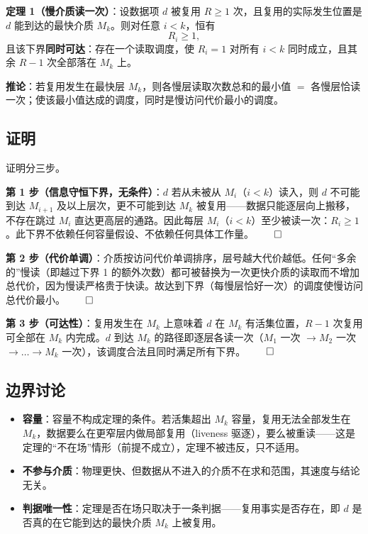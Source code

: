 \documentclass[11pt]{ctexart}
\begin{document}
\textbf{定理 1（慢介质读一次）}：设数据项 $d$ 被复用 $R\ge 1$ 次，且复用的实际发生位置是 $d$ 能到达的最快介质 $M_k$。则对任意 $i<k$，恒有
\[
R_i\ge 1,
\]
且该下界\textbf{同时可达}：存在一个读取调度，使 $R_i=1$ 对所有 $i<k$ 同时成立，且其余 $R-1$ 次全部落在 $M_k$ 上。

\textbf{推论}：若复用发生在最快层 $M_k$，则各慢层读取次数总和的最小值 $=$ 各慢层恰读一次；使该最小值达成的调度，同时是慢访问代价最小的调度。

\subsection{证明}

证明分三步。

\textbf{第 1 步（信息守恒下界，无条件）}：$d$ 若从未被从 $M_i$（$i<k$）读入，则 $d$ 不可能到达 $M_{i+1}$ 及以上层次，更不可能到达 $M_k$ 被复用——数据只能逐层向上搬移，不存在跳过 $M_i$ 直达更高层的通路。因此每层 $M_i$（$i<k$）至少被读一次：$R_i\ge 1$。此下界不依赖任何容量假设、不依赖任何具体工作量。\ensuremath{\qed}

\textbf{第 2 步（代价单调）}：介质按访问代价单调排序，层号越大代价越低。任何“多余的”慢读（即越过下界 1 的额外次数）都可被替换为一次更快介质的读取而不增加总代价，因为慢读严格贵于快读。故达到下界（每慢层恰好一次）的调度使慢访问总代价最小。\ensuremath{\qed}

\textbf{第 3 步（可达性）}：复用发生在 $M_k$ 上意味着 $d$ 在 $M_k$ 有活集位置，$R-1$ 次复用可全部在 $M_k$ 内完成。$d$ 到达 $M_k$ 的路径即逐层各读一次（$M_1$ 一次 $\to M_2$ 一次 $\to\dots\to M_k$ 一次），该调度合法且同时满足所有下界。\ensuremath{\qed}

\subsection{边界讨论}

\begin{itemize}
\item \textbf{容量}：容量不构成定理的条件。若活集超出 $M_k$ 容量，复用无法全部发生在 $M_k$，数据要么在更窄层内做局部复用（liveness 驱逐），要么被重读——这是定理的“不在场”情形（前提不成立），定理不被违反，只不适用。
\item \textbf{不参与介质}：物理更快、但数据从不进入的介质不在求和范围，其速度与结论无关。
\item \textbf{判据唯一性}：定理是否在场只取决于一条判据——复用事实是否存在，即 $d$ 是否真的在它能到达的最快介质 $M_k$ 上被复用。
\end{itemize}
\end{document}
